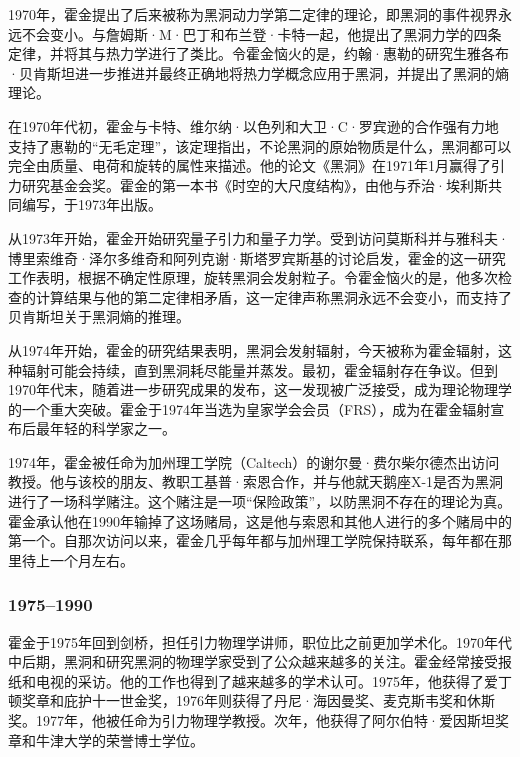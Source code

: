 1970年，霍金提出了后来被称为黑洞动力学第二定律的理论，即黑洞的事件视界永远不会变小。与詹姆斯·M·巴丁和布兰登·卡特一起，他提出了黑洞力学的四条定律，并将其与热力学进行了类比。令霍金恼火的是，约翰·惠勒的研究生雅各布·贝肯斯坦进一步推进并最终正确地将热力学概念应用于黑洞，并提出了黑洞的熵理论。

在1970年代初，霍金与卡特、维尔纳·以色列和大卫·C·罗宾逊的合作强有力地支持了惠勒的“无毛定理”，该定理指出，不论黑洞的原始物质是什么，黑洞都可以完全由质量、电荷和旋转的属性来描述。他的论文《黑洞》在1971年1月赢得了引力研究基金会奖。霍金的第一本书《时空的大尺度结构》，由他与乔治·埃利斯共同编写，于1973年出版。

从1973年开始，霍金开始研究量子引力和量子力学。受到访问莫斯科并与雅科夫·博里索维奇·泽尔多维奇和阿列克谢·斯塔罗宾斯基的讨论启发，霍金的这一研究工作表明，根据不确定性原理，旋转黑洞会发射粒子。令霍金恼火的是，他多次检查的计算结果与他的第二定律相矛盾，这一定律声称黑洞永远不会变小，而支持了贝肯斯坦关于黑洞熵的推理。

从1974年开始，霍金的研究结果表明，黑洞会发射辐射，今天被称为霍金辐射，这种辐射可能会持续，直到黑洞耗尽能量并蒸发。最初，霍金辐射存在争议。但到1970年代末，随着进一步研究成果的发布，这一发现被广泛接受，成为理论物理学的一个重大突破。霍金于1974年当选为皇家学会会员（FRS），成为在霍金辐射宣布后最年轻的科学家之一。

1974年，霍金被任命为加州理工学院（Caltech）的谢尔曼·费尔柴尔德杰出访问教授。他与该校的朋友、教职工基普·索恩合作，并与他就天鹅座X-1是否为黑洞进行了一场科学赌注。这个赌注是一项“保险政策”，以防黑洞不存在的理论为真。霍金承认他在1990年输掉了这场赌局，这是他与索恩和其他人进行的多个赌局中的第一个。自那次访问以来，霍金几乎每年都与加州理工学院保持联系，每年都在那里待上一个月左右。
\subsubsection{1975–1990}
霍金于1975年回到剑桥，担任引力物理学讲师，职位比之前更加学术化。1970年代中后期，黑洞和研究黑洞的物理学家受到了公众越来越多的关注。霍金经常接受报纸和电视的采访。他的工作也得到了越来越多的学术认可。1975年，他获得了爱丁顿奖章和庇护十一世金奖，1976年则获得了丹尼·海因曼奖、麦克斯韦奖和休斯奖。1977年，他被任命为引力物理学教授。次年，他获得了阿尔伯特·爱因斯坦奖章和牛津大学的荣誉博士学位。


